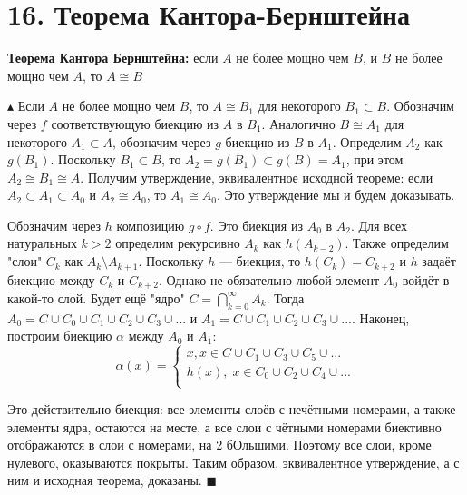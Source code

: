 \section*{16. Теорема Кантора-Бернштейна}

\par \textbf{Теорема Кантора Бернштейна: } если $A$ не более мощно чем $B$, и $B$ не более мощно чем $A$, то $A \cong B$
\par $\blacktriangle$ Если $A$ не более мощно чем $B$, то $A \cong B_1$ для некоторого $B_1 \subset B$. Обозначим через $f$ соответствующую биекцию из $A$ в $B_1$. Аналогично $B \cong A_1$ для некоторого $A_1 \subset A$, обозначим через $g$ биекцию из $B$ в $A_1$. Определим $A_2$ как $g(B_1)$. Поскольку $B_1 \subset B$, то $A_2 = g(B_1) \subset g(B) = A_1$, при этом $A_2 \cong B_1 \cong A$. Получим утверждение, эквивалентное исходной теореме: если $A_2 \subset A_1 \subset A_0$ и $A_2 \cong A_0$, то $A_1 \cong A_0$. Это утверждение мы и будем доказывать.
\par Обозначим через $h$ композицию $g \circ f$. Это биекция из $A_0$ в $A_2$. Для всех натуральных $k > 2$ определим рекурсивно $A_k$ как $h(A_{k-2})$. Также определим "слои"  $C_k$ как $A_k \setminus
A_{k+1}$. Поскольку $h$ — биекция, то $h(C_k) = C_{k+2}$ и $h$ задаёт биекцию между $C_k$ и $C_{k+2}$.
Однако не обязательно любой элемент $A_0$ войдёт в какой-то слой. Будет ещё "ядро" $C = \bigcap_{k=0}^{\infty} A_k$. Тогда $A_0 = C \cup C_0 \cup C_1 \cup C_2 \cup C_3 \cup . . .$ и $A_1 = C \cup C_1 \cup C_2 \cup C_3 \cup . . . $. Наконец,
построим биекцию $\alpha$ между $A_0$ и $A_1$:
$$\alpha(x)=\left\{
\begin{array}{ccc}
x, x \in C \cup C_1 \cup C_3 \cup C_5 \cup ...\\
h(x), \; x \in C_0 \cup C_2 \cup C_4 \cup ...\\
\end{array}
\right. $$
\par Это действительно биекция: все элементы слоёв с нечётными номерами, а также элементы ядра, остаются на месте, а все слои с чётными номерами биективно отображаются
в слои с номерами, на 2 бОльшими. Поэтому все слои, кроме нулевого, оказываются
покрыты. Таким образом, эквивалентное утверждение, а с ним и исходная теорема,
доказаны. $\blacksquare$

\begin{figure}[h]
\end{figure}